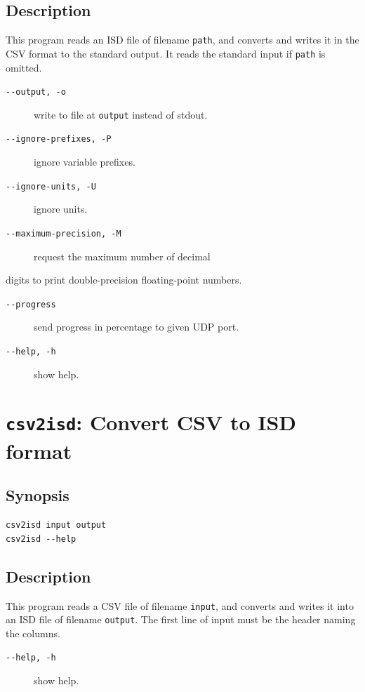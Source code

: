 \documentclass[a4paper,10pt]{report}
\begin{document}
\subsection{Description}
\label{sec:orgc11c45c}
This program reads an ISD file of filename \texttt{path}, and converts and writes
it in the CSV format to the standard output.
It reads the standard input if \texttt{path} is omitted.

\begin{description}
\item[{\texttt{-{}-output, -o}}] write to file at \texttt{output} instead of stdout.
\item[{\texttt{-{}-ignore-prefixes, -P}}] ignore variable prefixes.
\item[{\texttt{-{}-ignore-units, -U}}] ignore units.
\item[{\texttt{-{}-maximum-precision, -M}}] request the maximum number of decimal
\end{description}
digits to print double-precision floating-point numbers.
\begin{description}
\item[{\texttt{-{}-progress}}] send progress in percentage to given UDP port.
\item[{\texttt{-{}-help, -h}}] show help.
\end{description}

\section{\label{org372d440} \texttt{csv2isd}: Convert CSV to ISD format}
\label{sec:org96482c8}

\subsection{Synopsis}
\label{sec:org808ece9}
\begin{verbatim}
csv2isd input output
csv2isd --help
\end{verbatim}

\subsection{Description}
\label{sec:orga5cc51b}
This program reads a CSV file of filename \texttt{input}, and converts and writes
it into an ISD file of filename \texttt{output}.
The first line of input must be the header naming the columns.

\begin{description}
\item[{\texttt{-{}-help, -h}}] show help.
\end{description}
\end{document}
